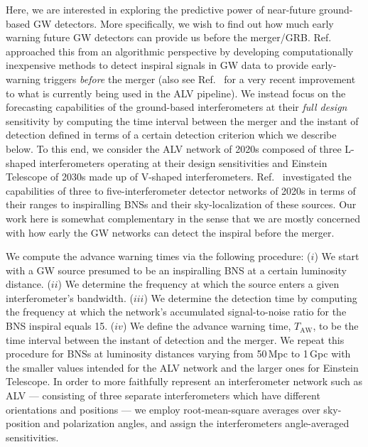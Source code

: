 \documentclass[prd,amsmath,amssymb,aps,floats,amsfonts,notitlepage,superscriptaddress,eqsecnum,nofootinbib,10pt]{revtex4-1}
\begin{document}
Here, we are interested  in exploring the predictive power of near-future ground-based GW detectors. 
More specifically, we wish to find out how much early warning future GW detectors can provide us before the merger/GRB.
Ref.~\cite{Cannon:2011vi} approached this from an algorithmic perspective by developing computationally inexpensive methods to detect inspiral
signals in GW data to provide early-warning triggers \emph{before} the merger (also see Ref.~\cite{Knowles:2018hqq} for a very recent improvement to what is currently being
used in the ALV pipeline).
We instead focus on the forecasting capabilities of the ground-based interferometers at their \emph{full design} sensitivity by computing the time interval
between the merger and the instant of detection defined in terms of a certain detection criterion which we describe below.
To this end, we consider the ALV network of 2020s composed of three L-shaped interferometers operating at their design sensitivities
and Einstein Telescope of 2030s made up of V-shaped interferometers.
Ref.~\cite{Nissanke:2012dj} investigated the capabilities of three to five-interferometer detector networks of 2020s in terms of their ranges
to inspiralling BNSs and their sky-localization of these sources. Our work here is somewhat complementary in the sense that we are mostly concerned with
how early the GW networks can detect the inspiral before the merger.

We compute the advance warning times via the following procedure: 
(${i}$) We start with a GW source presumed to be an inspiralling BNS at a certain luminosity distance. %
(${ii}$) We determine the frequency at which the source enters a given interferometer's bandwidth. 
(${iii}$) We determine the detection time by computing the frequency at which the network's accumulated signal-to-noise ratio for the BNS inspiral equals 15.
($iv$) We define the advance warning time, $T_\text{AW}$, to be the time interval between the instant of detection and the merger.
We repeat this procedure for BNSs at luminosity distances varying from 50\,Mpc to 1\,Gpc with the smaller values intended for the ALV network and 
the larger ones for Einstein Telescope.
In order to more faithfully represent an interferometer network such as ALV --- consisting of three separate interferometers which have different
orientations and positions --- we employ root-mean-square averages over sky-position and polarization angles,
and assign the interferometers angle-averaged sensitivities.
\end{document}
